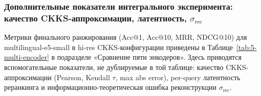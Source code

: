 \documentclass[a4paper, 12pt, oneside, openany]{article}
\begin{document}
\subsubsection{Дополнительные показатели интегрального эксперимента: качество CKKS-аппроксимации, латентность, $\sigma_{\mathrm{rec}}$}

Метрики финального ранжирования (Acc@1, Acc@10, MRR, NDCG@10) для multilingual-e5-small в hi-res CKKS-конфигурации приведены в Таблице~\ref{tab:5-multi-encoder} в подразделе «Сравнение пяти энкодеров». Здесь приводятся вспомогательные показатели, не дублируемые в той таблице: качество CKKS-аппроксимации (Pearson, Kendall $\tau$, max abs error), per-query латентность реранкинга и информационно-теоретическая ошибка реконструкции $\sigma_{\mathrm{rec}}$.

\begingroup\small\setlength{\tabcolsep}{3pt}
\end{document}
